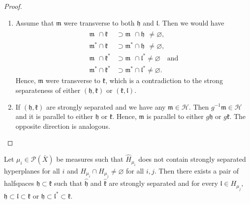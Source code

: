 \begin{proof}
  \begin{enumerate}
  \item Assume that \(\mathfrak{m}\) were transverse to both \(\mathfrak{h}\) and \(\mathfrak{l}\). Then we would have
    \begin{align*}
      \mathfrak{m}^{\phantom{\ast}} \cap \mathfrak{k}^{\phantom{\ast}} & \supset \mathfrak{m}^{\phantom{\ast}} \cap \mathfrak{h}^{\phantom{\ast}} \neq \varnothing,\\
      \mathfrak{m}^\ast \cap \mathfrak{k}^{\phantom{\ast}}  & \supset \mathfrak{m}^\ast \cap \mathfrak{h}^{\phantom{\ast}} \neq \varnothing,\\
      \mathfrak{m}^{\phantom{\ast}} \cap \mathfrak{k}^\ast & \supset \mathfrak{m}^{\phantom{\ast}} \cap \mathfrak{l}^\ast \neq \varnothing\quad \text{and}\\
      \mathfrak{m}^\ast \cap \mathfrak{k}^\ast & \supset \mathfrak{m}^\ast \cap \mathfrak{l}^\ast \neq \varnothing.
    \end{align*}
    Hence, \(\mathfrak{m}\) were transverse to \(\mathfrak{k}\), which is a contradiction to the strong separateness of either \((\mathfrak{h}, \mathfrak{k})\) or \((\mathfrak{k}, \mathfrak{l})\).
  \item If \((\mathfrak{h}, \mathfrak{k})\) are strongly separated and we have any \(\mathfrak{m} \in \mathcal{H}\). Then \(g^{-1}\mathfrak{m} \in \mathcal{H}\) and it is parallel to either \(\mathfrak{h}\) or \(\mathfrak{k}\). Hence, \(\mathfrak{m}\) is parallel to either \(g\mathfrak{h}\) or \(g\mathfrak{k}\). The opposite direction is analogous.
  \end{enumerate}
\end{proof}

\begin{lemma}[{\cite[Lemma~4.20]{MR3509968}}]
  \label{lem:4.20}
  Let \(\mu_i \in \mathcal{P}(\bar X)\) be measures such that \(\hat H_{\mu_i}\) does not contain strongly separated hyperplanes for all \(i\) and \(H_{\mu_i} \cap H_{\mu_j} \neq \varnothing\) for all \(i,j\). Then there exists a pair of halfspaces \(\mathfrak{h} \subset \mathfrak{k}\) such that \(\mathfrak{\hat h}\) and \(\mathfrak{\hat k}\) are strongly separated and for every \(\mathfrak{l} \in H_{\mu_j}\), \(\mathfrak{h} \subset \mathfrak{l} \subset \mathfrak{k}\) or \(\mathfrak{h} \subset \mathfrak{l}^\ast \subset \mathfrak{k}\).
\end{lemma}

